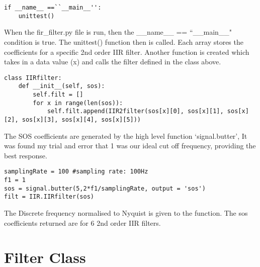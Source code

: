 \documentclass{article}
\begin{document}
\lstset{language=Python}
\begin{lstlisting}
if __name__ ==``__main__'':
    unittest()
\end{lstlisting}
When the fir\_filter.py file is run, then the \_\_name\_\_ == ``\_\_main\_\_" condition is true. The unittest() function then is called.
Each array stores the coefficients for a specific 2nd order IIR filter. Another function is created which takes in a data value (x) and calls the filter defined in the class above.
\newline 
\lstset{language=Python}
\begin{lstlisting}
class IIRfilter: 
    def __init__(self, sos):
        self.filt = []
        for x in range(len(sos)):
            self.filt.append(IIR2filter(sos[x][0], sos[x][1], sos[x][2], sos[x][3], sos[x][4], sos[x][5]))
\end{lstlisting}
\newline
The SOS coefficients are generated by the high level function `signal.butter', It was found my trial and error that 1 was our ideal cut off frequency, providing the best response.
\newline
\lstset{language=Python}
\begin{lstlisting}
samplingRate = 100 #sampling rate: 100Hz
f1 = 1
sos = signal.butter(5,2*f1/samplingRate, output = 'sos') 
filt = IIR.IIRfilter(sos) 
\end{lstlisting}
\newline
\newline
The Discrete frequency normalised to Nyquist is given to the function. The sos coefficients returned are for 6 2nd order IIR filters. 



\section{Filter Class}
\end{document}
